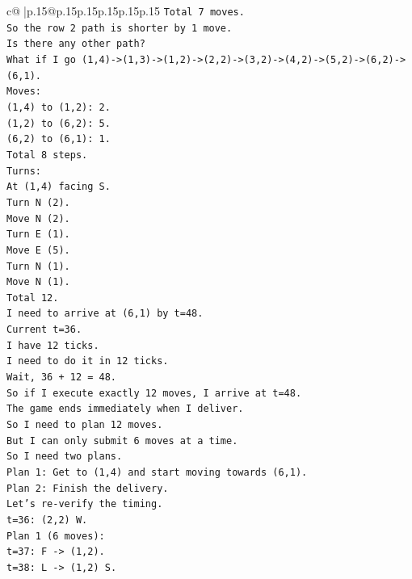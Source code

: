 \documentclass{article}
\begin{document}
{\begin{supertabular}{c@{$\;$}|p{.15\linewidth}@{}p{.15\linewidth}p{.15\linewidth}p{.15\linewidth}p{.15\linewidth}p{.15\linewidth}}
{{{\texttt{Total 7 moves.} \\
\texttt{So the row 2 path is shorter by 1 move.} \\
\texttt{Is there any other path?} \\
\texttt{What if I go (1,4){-}>(1,3){-}>(1,2){-}>(2,2){-}>(3,2){-}>(4,2){-}>(5,2){-}>(6,2){-}>(6,1).} \\
\texttt{Moves:} \\
\texttt{(1,4) to (1,2): 2.} \\
\texttt{(1,2) to (6,2): 5.} \\
\texttt{(6,2) to (6,1): 1.} \\
\texttt{Total 8 steps.} \\
\texttt{Turns:} \\
\texttt{At (1,4) facing S.} \\
\texttt{Turn N (2).} \\
\texttt{Move N (2).} \\
\texttt{Turn E (1).} \\
\texttt{Move E (5).} \\
\texttt{Turn N (1).} \\
\texttt{Move N (1).} \\
\texttt{Total 12.} \\
\texttt{I need to arrive at (6,1) by t=48.} \\
\texttt{Current t=36.} \\
\texttt{I have 12 ticks.} \\
\texttt{I need to do it in 12 ticks.} \\
\texttt{Wait, 36 + 12 = 48.} \\
\texttt{So if I execute exactly 12 moves, I arrive at t=48.} \\
\texttt{The game ends immediately when I deliver.} \\
\texttt{So I need to plan 12 moves.} \\
\texttt{But I can only submit 6 moves at a time.} \\
\texttt{So I need two plans.} \\
\texttt{Plan 1: Get to (1,4) and start moving towards (6,1).} \\
\texttt{Plan 2: Finish the delivery.} \\
\texttt{Let's re{-}verify the timing.} \\
\texttt{t=36: (2,2) W.} \\
\texttt{Plan 1 (6 moves):} \\
\texttt{t=37: F {-}> (1,2).} \\
\texttt{t=38: L {-}> (1,2) S.} \\
}}}
\end{supertabular}}
\end{document}
